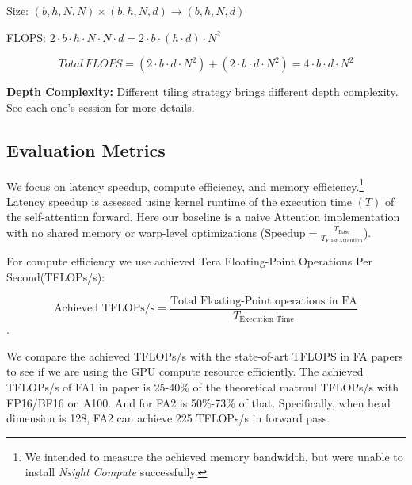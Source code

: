 \documentclass[11pt]{article}
\renewcommand\cite{\citep}  %
\begin{document}
Size: $(b, h, N, N) \times (b, h, N, d) \rightarrow (b, h, N, d)$

FLOPS: $2 \cdot b \cdot h \cdot N \cdot N \cdot d = 2 \cdot b \cdot (h \cdot d) \cdot N^2$

$$ Total\, FLOPS = (2 \cdot b \cdot d \cdot N^2) + (2 \cdot b \cdot d \cdot N^2) = 4 \cdot b \cdot d \cdot N^2 $$


\textbf{Depth Complexity: } Different tiling strategy brings different depth complexity. See each one's session for more details.


\subsection{Evaluation Metrics}
We focus on latency speedup, compute efficiency, and memory efficiency.\footnote{We intended to measure the achieved memory bandwidth, but were unable to install \textit{Nsight Compute} successfully.} Latency speedup is assessed using kernel runtime of the execution time $(T)$ of the self-attention forward. Here our baseline is a naive Attention implementation with no shared memory or warp-level optimizations ($\text{Speedup} = \frac{T_{\text{Base}}}{T_{\text{FlashAttention}}}$).

For compute efficiency we use achieved Tera Floating-Point Operations Per Second(TFLOPs/s): 

$$\text{Achieved TFLOPs/s} = \frac{\text{Total Floating-Point operations in FA}}{T_{\text{Execution Time}}}$$.

We compare the achieved TFLOPs/s with the state-of-art TFLOPS in FA papers to see if we are using the GPU compute resource efficiently. The achieved TFLOPs/s of FA1 in paper is 25-40\% of the theoretical matmul TFLOPs/s with FP16/BF16 on A100. And for FA2 is 50\%-73\% of that\cite{dao2023flashattention}. Specifically, when head dimension is 128, FA2 can achieve 225 TFLOPs/s in forward pass.




 \begin{comment}
\begin{algorithm}[htbp]
  \caption{Standard Attention}
  \label{alg:standard_attention}
  \begin{algorithmic}[1]
    \STATE Load $Q$ and $K$ by blocks from HBM.
    \STATE Compute $S = (1/\sqrt{d})QK^T$ (GEMM-I).
    \STATE Write $S$ to HBM.
    \STATE Read $S$ from HBM.
    \STATE Compute $S = S - \text{rowmax}(S)$.
    \STATE Compute $P = \text{softmax}(S)$.
    \STATE Write $P$ to HBM.
    \STATE Load $P$ and $V$ by blocks from HBM.
    \STATE Compute $O = PV$ (GEMM-II).
    \STATE Write $O$ to HBM.
  \end{algorithmic}
\end{algorithm}
\end{comment}
\end{document}
